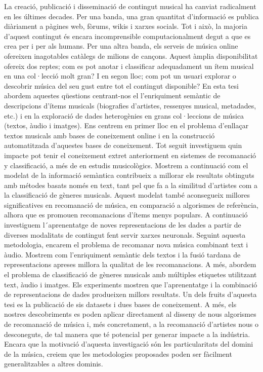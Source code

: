 La creació, publicació i disseminació de contingut musical ha canviat radicalment en les últimes decades. Per una banda, una gran quantitat d’informació es publica diàriament a pàgines web, fòrums, wikis i xarxes socials. Tot i això, la majoria d’aquest contingut és encara incomprensible computacionalment degut a que es crea per i per als humans. Per una altra banda, els serveis de música online ofereixen inagotables catàlegs de milions de cançons. Aquest àmplia disponibilitat ofereix dos reptes; com es pot anotar i classificar adequadament un ítem musical en una col·lecció molt gran? I en segon lloc; com pot un usuari explorar o descobrir música del seu gust entre tot el contingut disponible? En esta tesi abordem aquestes qüestions centrant-nos el l’enriquiment semàntic de descripcions d’ítems musicals (biografies d’artistes, ressenyes musical, metadades, etc.) i en la exploració de dades heterogènies en grans col·leccions de música (textos, àudio i imatges). Ens centrem en primer lloc en el problema d’enllaçar textos musicals amb bases de coneixement online i en la construcció automatitzada d’aquestes bases de coneixement.
Tot seguit investiguem quin impacte pot tenir el coneixement extret anteriorment en sistemes de recomanació y classificació, a més de en estudis musicològics. Mostrem a continuació com el modelat de la informació semàntica contribueix a millorar els resultats obtinguts amb métodes basats només en text, tant pel que fa a la similitud d’artistes com a la classificació de gèneres musicals.  Aquest modelat també aconsegueix millores significatives en recomanació de música, en comparació a algorismes de referència, alhora que es promouen recomanacions d’ítems menys populars. A continuació investiguem l´aprenentatge de noves representacions de les dades a partir de diverses modalitats de contingut fent servir xarxes neuronals. Seguint aquesta metodologia, encarem el problema de recomanar nova música combinant text i àudio. Mostrem com l’enriquiment semàntic dels textos i la fusió tardana de representacions apreses millora la qualitat de les recomanacions. A més, abordem el problema de classificació de gèneres musicals amb múltiples etiquetes utilitzant text, àudio i imatges. Els experiments mostren que l’aprenentatge i la combinació de representacions de dades produeixen millors resultats. Un dels fruits d’aquesta tesi es la publicació de sis datasets i dues bases de coneixement. A més, els nostres descobriments es poden aplicar directament al disseny de nous algorismes de recomanació de música i, més concretament, a la recomanació d’artistes nous o desconeguts, de tal manera que té potencial per generar impacte a la indústria. Encara que la motivació d’aquesta investigació són les particularitats del domini de la música, creiem que les metodologies proposades poden ser fàcilment generalitzables a altres dominis.  
